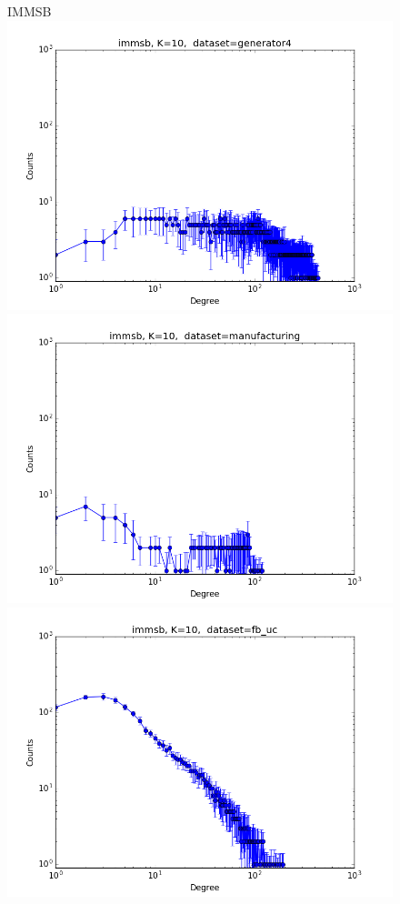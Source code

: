 \begin{figure}[ht]
    \vspace{-3cm}
	\centering IMMSB\\
	\includegraphics[scale=0.27]{img/expe/4_mmsb/figure_1}
	\endminipage
	\includegraphics[scale=0.27]{img/expe/5_mmsb/figure_1}
	\endminipage
	\includegraphics[scale=0.27]{img/expe/6_mmsb/figure_1}

\end{figure}
